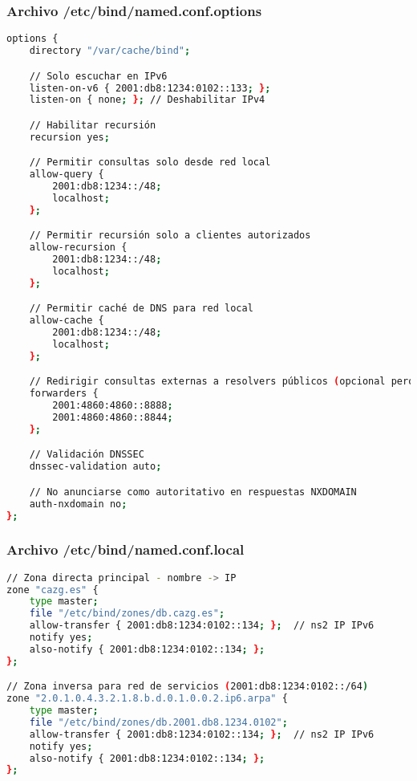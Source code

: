 \subsubsection{Archivo /etc/bind/named.conf.options}
\label{Apendice2:named.conf.options}
\begin{lstlisting}[language=bash]
options {
    directory "/var/cache/bind";

    // Solo escuchar en IPv6
    listen-on-v6 { 2001:db8:1234:0102::133; };
    listen-on { none; }; // Deshabilitar IPv4

    // Habilitar recursión
    recursion yes;

    // Permitir consultas solo desde red local
    allow-query {
        2001:db8:1234::/48;
        localhost;
    };

    // Permitir recursión solo a clientes autorizados
    allow-recursion {
        2001:db8:1234::/48;
        localhost;
    };

    // Permitir caché de DNS para red local
    allow-cache {
        2001:db8:1234::/48;
        localhost;
    };

    // Redirigir consultas externas a resolvers públicos (opcional pero recomendado)
    forwarders {
        2001:4860:4860::8888;
        2001:4860:4860::8844;
    };

    // Validación DNSSEC
    dnssec-validation auto;

    // No anunciarse como autoritativo en respuestas NXDOMAIN
    auth-nxdomain no;
};

\end{lstlisting}

\subsubsection{Archivo /etc/bind/named.conf.local}
\label{Apendice2:named.conf.local}
\begin{lstlisting}[language=bash]
// Zona directa principal - nombre -> IP
zone "cazg.es" {
    type master;
    file "/etc/bind/zones/db.cazg.es";
    allow-transfer { 2001:db8:1234:0102::134; };  // ns2 IP IPv6
    notify yes;
    also-notify { 2001:db8:1234:0102::134; };
};

// Zona inversa para red de servicios (2001:db8:1234:0102::/64)
zone "2.0.1.0.4.3.2.1.8.b.d.0.1.0.0.2.ip6.arpa" {
    type master;
    file "/etc/bind/zones/db.2001.db8.1234.0102"; 
    allow-transfer { 2001:db8:1234:0102::134; };  // ns2 IP IPv6
    notify yes;
    also-notify { 2001:db8:1234:0102::134; };
}; 
\end{lstlisting}


